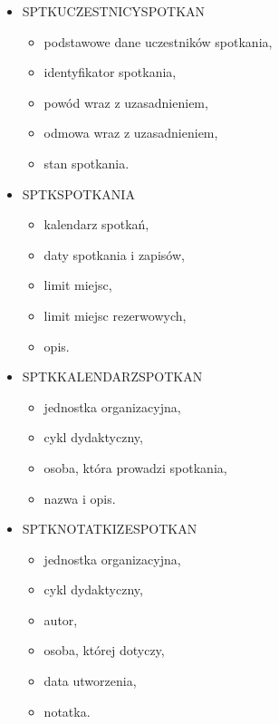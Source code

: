 \documentclass[licencjacka]{pracamgr}
\begin{document}
\begin{itemize}
\item SPTK\textunderscore UCZESTNICY\textunderscore SPOTKAN
	\begin{itemize}
	\item podstawowe dane uczestników spotkania,
	\item identyfikator spotkania,
	\item powód wraz z uzasadnieniem,
	\item odmowa wraz z uzasadnieniem,
	\item stan spotkania.
	\end{itemize}
\item SPTK\textunderscore SPOTKANIA
	\begin{itemize}
	\item kalendarz spotkań,
	\item daty spotkania i zapisów,
	\item limit miejsc,
	\item limit miejsc rezerwowych,
	\item opis.
	\end{itemize}
\item SPTK\textunderscore KALENDARZ\textunderscore SPOTKAN
	\begin{itemize}
	\item jednostka organizacyjna,
	\item cykl dydaktyczny,
	\item osoba, która prowadzi spotkania,
	\item nazwa i opis.
	\end{itemize}
\item SPTK\textunderscore NOTATKI\textunderscore ZE\textunderscore SPOTKAN
	\begin{itemize}
	\item jednostka organizacyjna,
	\item cykl dydaktyczny,
	\item autor,
	\item osoba, której dotyczy,
	\item data utworzenia,
	\item notatka.
	\end{itemize}
\end{itemize}
\end{document}
